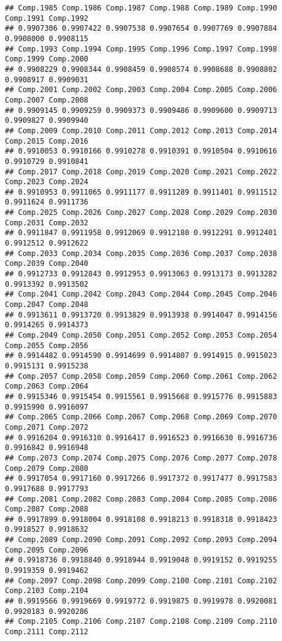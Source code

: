 \documentclass[
]{article}
\begin{document}
\begin{verbatim}
## Comp.1985 Comp.1986 Comp.1987 Comp.1988 Comp.1989 Comp.1990 Comp.1991 Comp.1992 
## 0.9907306 0.9907422 0.9907538 0.9907654 0.9907769 0.9907884 0.9908000 0.9908115 
## Comp.1993 Comp.1994 Comp.1995 Comp.1996 Comp.1997 Comp.1998 Comp.1999 Comp.2000 
## 0.9908229 0.9908344 0.9908459 0.9908574 0.9908688 0.9908802 0.9908917 0.9909031 
## Comp.2001 Comp.2002 Comp.2003 Comp.2004 Comp.2005 Comp.2006 Comp.2007 Comp.2008 
## 0.9909145 0.9909259 0.9909373 0.9909486 0.9909600 0.9909713 0.9909827 0.9909940 
## Comp.2009 Comp.2010 Comp.2011 Comp.2012 Comp.2013 Comp.2014 Comp.2015 Comp.2016 
## 0.9910053 0.9910166 0.9910278 0.9910391 0.9910504 0.9910616 0.9910729 0.9910841 
## Comp.2017 Comp.2018 Comp.2019 Comp.2020 Comp.2021 Comp.2022 Comp.2023 Comp.2024 
## 0.9910953 0.9911065 0.9911177 0.9911289 0.9911401 0.9911512 0.9911624 0.9911736 
## Comp.2025 Comp.2026 Comp.2027 Comp.2028 Comp.2029 Comp.2030 Comp.2031 Comp.2032 
## 0.9911847 0.9911958 0.9912069 0.9912180 0.9912291 0.9912401 0.9912512 0.9912622 
## Comp.2033 Comp.2034 Comp.2035 Comp.2036 Comp.2037 Comp.2038 Comp.2039 Comp.2040 
## 0.9912733 0.9912843 0.9912953 0.9913063 0.9913173 0.9913282 0.9913392 0.9913502 
## Comp.2041 Comp.2042 Comp.2043 Comp.2044 Comp.2045 Comp.2046 Comp.2047 Comp.2048 
## 0.9913611 0.9913720 0.9913829 0.9913938 0.9914047 0.9914156 0.9914265 0.9914373 
## Comp.2049 Comp.2050 Comp.2051 Comp.2052 Comp.2053 Comp.2054 Comp.2055 Comp.2056 
## 0.9914482 0.9914590 0.9914699 0.9914807 0.9914915 0.9915023 0.9915131 0.9915238 
## Comp.2057 Comp.2058 Comp.2059 Comp.2060 Comp.2061 Comp.2062 Comp.2063 Comp.2064 
## 0.9915346 0.9915454 0.9915561 0.9915668 0.9915776 0.9915883 0.9915990 0.9916097 
## Comp.2065 Comp.2066 Comp.2067 Comp.2068 Comp.2069 Comp.2070 Comp.2071 Comp.2072 
## 0.9916204 0.9916310 0.9916417 0.9916523 0.9916630 0.9916736 0.9916842 0.9916948 
## Comp.2073 Comp.2074 Comp.2075 Comp.2076 Comp.2077 Comp.2078 Comp.2079 Comp.2080 
## 0.9917054 0.9917160 0.9917266 0.9917372 0.9917477 0.9917583 0.9917688 0.9917793 
## Comp.2081 Comp.2082 Comp.2083 Comp.2084 Comp.2085 Comp.2086 Comp.2087 Comp.2088 
## 0.9917899 0.9918004 0.9918108 0.9918213 0.9918318 0.9918423 0.9918527 0.9918632 
## Comp.2089 Comp.2090 Comp.2091 Comp.2092 Comp.2093 Comp.2094 Comp.2095 Comp.2096 
## 0.9918736 0.9918840 0.9918944 0.9919048 0.9919152 0.9919255 0.9919359 0.9919462 
## Comp.2097 Comp.2098 Comp.2099 Comp.2100 Comp.2101 Comp.2102 Comp.2103 Comp.2104 
## 0.9919566 0.9919669 0.9919772 0.9919875 0.9919978 0.9920081 0.9920183 0.9920286 
## Comp.2105 Comp.2106 Comp.2107 Comp.2108 Comp.2109 Comp.2110 Comp.2111 Comp.2112 

\end{verbatim}
\end{document}

